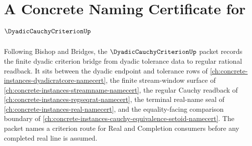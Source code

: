\chapter{A Concrete Naming Certificate for $\DyadicCauchyCriterionUp$}
\label{ch:concrete-instances-dyadic-cauchy-criterion-namecert}

Following Bishop and Bridges, the $\DyadicCauchyCriterionUp$ packet records the finite dyadic criterion bridge from dyadic tolerance data to regular rational readback. It sits between the dyadic endpoint and tolerance rows of \autoref{ch:concrete-instances-dyadicratcore-namecert}, the finite stream-window surface of \autoref{ch:concrete-instances-streamname-namecert}, the regular Cauchy readback of \autoref{ch:concrete-instances-regseqrat-namecert}, the terminal real-name seal of \autoref{ch:concrete-instances-real-namecert}, and the equality-facing comparison boundary of \autoref{ch:concrete-instances-cauchy-equivalence-setoid-namecert}. The packet names a criterion route for Real and Completion consumers before any completed real line is assumed.

